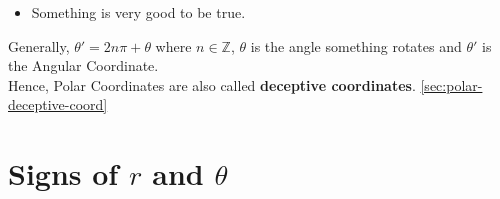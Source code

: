 \begin{itemize}
  \item Something is very good to be true.
\end{itemize}


\begin{note}
  Generally, \(\theta'=2n\pi+\theta\) where \(n \in \mathbb{Z}\), \(\theta\) is
  the angle something rotates and \(\theta'\) is the Angular Coordinate.\\
  Hence, Polar Coordinates are also called \textbf{deceptive coordinates}.
  \autoref{sec:polar-deceptive-coord}
\end{note}

\section{Signs of \(r\) and \( \theta \)}
\label{sec:signs-r-theta}

